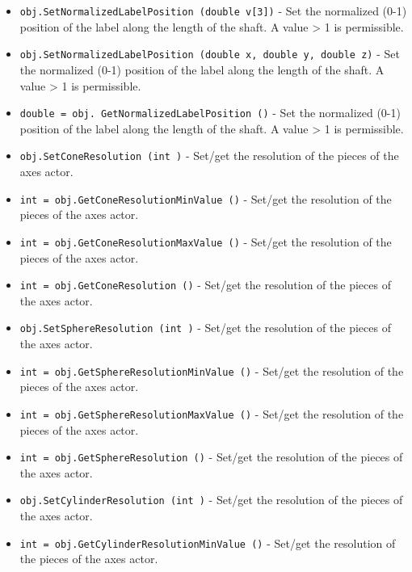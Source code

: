 \begin{itemize}
\item  \verb|obj.SetNormalizedLabelPosition (double v[3])| -  Set the normalized (0-1) position of the label along the length of
 the shaft.  A value > 1 is permissible.

\item  \verb|obj.SetNormalizedLabelPosition (double x, double y, double z)| -  Set the normalized (0-1) position of the label along the length of
 the shaft.  A value > 1 is permissible.

\item  \verb|double = obj. GetNormalizedLabelPosition ()| -  Set the normalized (0-1) position of the label along the length of
 the shaft.  A value > 1 is permissible.

\item  \verb|obj.SetConeResolution (int )| -  Set/get the resolution of the pieces of the axes actor.

\item  \verb|int = obj.GetConeResolutionMinValue ()| -  Set/get the resolution of the pieces of the axes actor.

\item  \verb|int = obj.GetConeResolutionMaxValue ()| -  Set/get the resolution of the pieces of the axes actor.

\item  \verb|int = obj.GetConeResolution ()| -  Set/get the resolution of the pieces of the axes actor.

\item  \verb|obj.SetSphereResolution (int )| -  Set/get the resolution of the pieces of the axes actor.

\item  \verb|int = obj.GetSphereResolutionMinValue ()| -  Set/get the resolution of the pieces of the axes actor.

\item  \verb|int = obj.GetSphereResolutionMaxValue ()| -  Set/get the resolution of the pieces of the axes actor.

\item  \verb|int = obj.GetSphereResolution ()| -  Set/get the resolution of the pieces of the axes actor.

\item  \verb|obj.SetCylinderResolution (int )| -  Set/get the resolution of the pieces of the axes actor.

\item  \verb|int = obj.GetCylinderResolutionMinValue ()| -  Set/get the resolution of the pieces of the axes actor.


\end{itemize}
